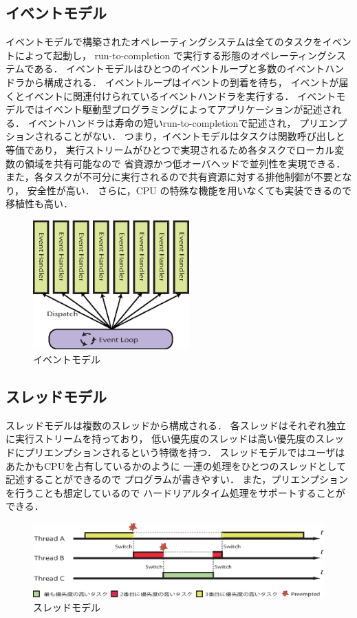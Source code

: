 \subsection{イベントモデル}
イベントモデルで構築されたオペレーティングシステムは全てのタスクをイベントによって起動し，
run-to-completion で実行する形態のオペレーティングシステムである．
イベントモデルはひとつのイベントループと多数のイベントハンドラから構成される．
イベントループはイベントの到着を待ち，
イベントが届くとイベントに関連付けられているイベントハンドラを実行する．
イベントモデルではイベント駆動型プログラミングによってアプリケーションが記述される．
イベントハンドラは寿命の短いrun-to-completionで記述され，
プリエンプションされることがない．
つまり，イベントモデルはタスクは関数呼び出しと等価であり，
実行ストリームがひとつで実現されるため各タスクでローカル変数の領域を共有可能なので
省資源かつ低オーバヘッドで並列性を実現できる．
また，各タスクが不可分に実行されるので共有資源に対する排他制御が不要となり，
安全性が高い．
さらに，CPU の特殊な機能を用いなくても実装できるので移植性も高い．
\begin{figure}[htbp]
 \begin{center}
  \includegraphics[width=60mm]{./images/event_model.eps}
 \end{center}
 \caption{イベントモデル}
 \label{fig:event_model}
\end{figure}


\subsection{スレッドモデル}
スレッドモデルは複数のスレッドから構成される．
各スレッドはそれぞれ独立に実行ストリームを持っており，
低い優先度のスレッドは高い優先度のスレッドにプリエンプションされるという特徴を持つ．
スレッドモデルではユーザはあたかもCPUを占有しているかのように
一連の処理をひとつのスレッドとして記述することができるので
プログラムが書きやすい．
また，プリエンプションを行うことも想定しているので
ハードリアルタイム処理をサポートすることができる．
\begin{figure}[htbp]
 \begin{center}
  \includegraphics[width=140mm]{./images/threads_model.eps}
 \end{center}
 \caption{スレッドモデル}
 \label{fig:threads_model}
\end{figure}

